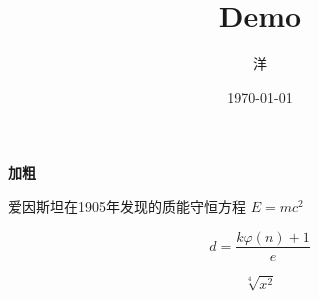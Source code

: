 \documentclass[UTF8]{ctexart} %
\title{Demo}
\author{洋}
\date{\today}{\tiny }
\begin{document}
\maketitle

\textbf{加粗}

爱因斯坦在1905年发现的质能守恒方程 $	E=mc^2 $

\[
	d=\frac{k \varphi(n)+1}{e}
\]

\[
	\sqrt[4]{x^2}
\]
\end{document}
